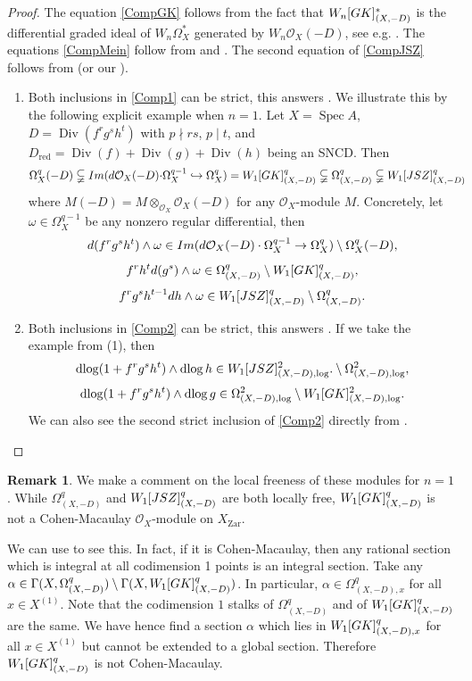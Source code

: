 \documentclass[11pt]{amsart}
\newcommand{\ra}{\rightarrow}
\newcommand{\cO}{\mathcal{O}}
\newcommand{\Spec}{\operatorname{Spec}}
\newcommand{\Div}{\operatorname{Div}}
\newcommand{\red}{{\operatorname{red}}}
\newcommand{\dlog}{\operatorname{dlog}}
\newcommand{\hra}{\hookrightarrow}
\newcommand{\Zar}{{\operatorname{Zar}}}
\theoremstyle{plain}
\theoremstyle{definition}
\newtheorem{remark}[prop]{Remark}
\numberwithin{equation}{prop}
\begin{document}
\begin{proof}
The equation \eqref{CompGK} follows from the fact that $W_n[{\rm GK}]^*_{(X,-D)}$ is the differential graded ideal of $W_n\Omega^*_{X}$ generated by $W_n\cO_X(-D)$, see e.g. \cite[Lemma 1.20]{Rue}.
The equations \eqref{CompMein} follow from \cite[Lemma 8.4]{RamFil1} and .
The second equation of \eqref{CompJSZ} follows from \cite[Theorem 1.2.1]{JSZ} (or our ).
\begin{enumerate}
    \item 
Both inclusions in \eqref{Comp1} can be strict, this answers \cite[11.5(4)]{RamFil1}.
We illustrate this by the following explicit example when $n=1$. 
Let $X=\Spec A$,  $D=\Div(f^rg^sh^t)$
with $p\nmid rs$, $p\mid t$, and $D_{\red}=\Div(f)+\Div(g)+\Div(h)$ being an SNCD.
Then
\begin{align*}
\Omega^q_X(-D)\subsetneqq 
{\rm Im}(d\cO_X(-D)\cdot &\Omega^{q-1}_X\hra \Omega^q_X)
=
W_1[{\rm GK}]^q_{(X,-D)}
\subsetneqq \Omega^q_{(X,-D)}
\subsetneqq 
W_1[{\rm JSZ}]^q_{(X,-D)}
\end{align*}
where $M(-D)=M\otimes_{\cO_X} \cO_X(-D)$ for any $\cO_X$-module $M$.
Concretely, let $\omega\in\Omega^{q-1}_X$ be any nonzero regular differential, then
$$d(f^rg^sh^t)\wedge \omega\in 
{\rm Im}(d\cO_X(-D)\cdot \Omega^{q-1}_X\ra \Omega^q_X)
\setminus \Omega^q_X(-D),
$$
$$f^rh^td(g^s) \wedge \omega\in \Omega^q_{(X,-D)}\setminus 
W_1[{\rm GK}]^q_{(X,-D)},$$
$$f^rg^sh^{t-1}dh \wedge \omega\in 
W_1[{\rm JSZ}]^q_{(X,-D)}\setminus 
\Omega^q_{(X,-D)}.$$
\item 
Both inclusions in \eqref{Comp2} can be strict, this answers \cite[Remark 11.7(1)]{RamFil1}.
If we take the example from (1), then 
$$\dlog(1+f^rg^sh^t)\wedge\dlog h \in
W_1[{\rm JSZ}]^2_{(X,-D),\log}.\setminus\Omega^2_{(X,-D),\log},$$
$$\dlog(1+f^rg^sh^t)\wedge\dlog g \in
\Omega^2_{(X,-D),\log}\setminus W_1[{\rm GK}]^2_{(X,-D),\log}.$$
We can also see the second strict inclusion of \eqref{Comp2} directly from . 
\end{enumerate}
\end{proof}
\begin{remark}
We make a comment on the local freeness of these modules for $n=1$.
While $\Omega^q_{(X,-D)}$ and $W_1[{\rm JSZ}]^q_{(X,-D)}$ are both locally free, $W_1[{\rm GK}]^q_{(X,-D)}$ is not a Cohen-Macaulay $\cO_X$-module on $X_\Zar$.

We can use  to see this. In fact, if it is Cohen-Macaulay, then any rational section which is integral at all codimension 1 points is an integral section.
Take any  $\alpha\in  \Gamma(X, \Omega^q_{(X,-D)})\setminus \Gamma(X, W_1[{\rm GK}]^q_{(X,-D)})$.
In particular, $\alpha\in \Omega^q_{(X,-D),x}$ for all $x\in X^{(1)}$.
Note that the codimension $1$ stalks of $\Omega^q_{(X,-D)}$ and of $W_1[{\rm GK}]^q_{(X,-D)}$ are the same.
We have hence find a section $\alpha$ which lies in $W_1[{\rm GK}]^q_{(X,-D),x}$ for all $x\in X^{(1)}$ but cannot be extended to a global section. 
Therefore $W_1[{\rm GK}]^q_{(X,-D)}$ is not Cohen-Macaulay.
\end{remark}
\end{document}

